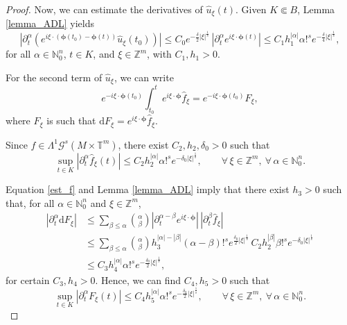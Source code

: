 \documentclass[11pt,reqno]{amsart}
\numberwithin{equation}{section}
\begin{document}
\begin{proof}
	
	Now, we can estimate the derivatives of \(\widehat{u}_\xi(t)\).
	Given \(K\Subset B\), Lemma \ref{lemma_ADL} yields
	\begin{equation}\label{est_eu}
		\left|\partial_t^\alpha\!\left(e^{i\xi\cdot (\boldsymbol{\phi}(t_0)-\boldsymbol{\phi}(t))}\widehat{u}_\xi(t_0)\right)\right|
		\leq C_0e^{-\frac{\delta}{2}|\xi|^{\frac{1}{s}}}\,|\partial_t^\alpha e^{i\xi\cdot\boldsymbol{\phi}(t)}|
		\leq C_1h_1^{|\alpha|}\alpha!^s e^{-\frac{\delta}{4}|\xi|^{\frac{1}{s}}},
	\end{equation}
	for all \(\alpha\in\mathbb{N}_0^n\), \(t\in K\), and \(\xi\in\mathbb{Z}^m\), with \(C_1,h_1>0\).
	
	For the second term of \(\widehat{u}_\xi\), we can write
	\[
	e^{-i\xi\cdot\boldsymbol{\phi}(t_0)}\int_{t_0}^t e^{i\xi\cdot\boldsymbol{\phi}}\widehat{f}_\xi
	= e^{-i\xi\cdot\boldsymbol{\phi}(t_0)}F_\xi,
	\]
	where \(F_\xi\) is such that \(\mathrm{d}F_\xi = e^{i\xi\cdot\boldsymbol{\phi}}\widehat{f}_\xi\).
	
	Since \(f\in\mathsf{\Lambda}^1\mathscr{G}^s(M\times\mathbb{T}^m)\), there exist \(C_2,h_2,\delta_0>0\) such that
	\begin{equation}\label{est_f} 
		\sup_{t\in K}|\partial_t^\alpha \widehat{f}_\xi(t)|
		\leq C_2h_2^{|\alpha|}\alpha!^s e^{-\delta_0|\xi|^{\frac{1}{s}}},\qquad\forall\,\xi\in\mathbb{Z}^m,\ \forall\,\alpha\in\mathbb{N}_0^n.
	\end{equation}
	
	Equation \eqref{est_f} and Lemma \ref{lemma_ADL} imply that there exist \(h_3>0\) such that, for all \(\alpha\in\mathbb{N}_0^n\) and \(\xi\in\mathbb{Z}^m\),
	\begin{align*}
		|\partial_t^\alpha \mathrm{d}F_\xi|
		&\leq \sum_{\beta\leq\alpha}\binom{\alpha}{\beta}
		|\partial_t^{\alpha-\beta}e^{i\xi\cdot\boldsymbol{\phi}}|\,
		|\partial_t^{\beta}\widehat{f}_\xi|\\
		&\leq
		\sum_{\beta\leq\alpha}\binom{\alpha}{\beta}
		h_3^{|\alpha|-|\beta|}(\alpha-\beta)!^s e^{\frac{\delta_0}{2}|\xi|^{\frac{1}{s}}}
		\, C_2h_2^{|\beta|}\beta!^s e^{-\delta_0|\xi|^{\frac{1}{s}}}\\
		&\leq C_3h_4^{|\alpha|}\alpha!^s e^{-\frac{\delta_0}{2}|\xi|^{\frac{1}{s}}},
	\end{align*}
	for certain \(C_3,h_4>0\).
	Hence, we can find \(C_4,h_5>0\) such that
	\[
	\sup_{t\in K}|\partial_t^\alpha F_\xi(t)|
	\leq C_4h_5^{|\alpha|}\alpha!^s e^{-\frac{\delta_0}{2}|\xi|^{\frac{1}{s}}},\qquad\forall\,\xi\in\mathbb{Z}^m,\ \forall\,\alpha\in\mathbb{N}_0^n.
	\]
	

\end{proof}
\end{document}
